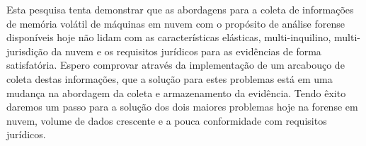 \documentclass[12pt,				%
	openright,			%
	oneside,			%
	a4paper,			%
	english,			%
	brazil				%
	]{abntex2}
\begin{document}
\pagebreak

%
%

%


\setlength{\absparsep}{18pt} %
\begin{resumo}
Esta pesquisa tenta demonstrar que as abordagens para a coleta de informações de memória volátil de máquinas em nuvem com o propósito de análise forense disponíveis hoje não 
lidam com as características elásticas, multi-inquilino, multi-jurisdição da nuvem e os requisitos jurídicos para as evidências de forma satisfatória. Espero comprovar através
da implementação de um arcabouço de coleta destas informações, que a solução para estes problemas está em uma mudança na abordagem da coleta e armazenamento 
da evidência. Tendo êxito daremos um passo para a solução dos dois maiores problemas hoje na forense em nuvem, volume de dados crescente e a pouca conformidade com requisitos jurídicos.

 

\end{resumo}

%
%  


\end{document}
